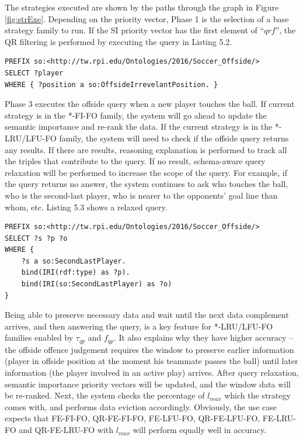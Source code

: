 The strategies executed are shown by the paths through the graph in Figure \ref{fig:strExe}. 
Depending on the priority vector, Phase 1 is the selection of a base strategy family to run. 
If the SI priority vector has the first element of ``$qrf$'', the QR filtering is performed by executing the query in Listing 5.2.

\begin{lstlisting}[language=SPARQL,caption={Query Relevance Filtering Query},basicstyle=\small,frame=single]
PREFIX so:<http://tw.rpi.edu/Ontologies/2016/Soccer_Offside/>
SELECT ?player 
WHERE { ?position a so:OffsideIrrevelantPosition. }
\end{lstlisting}

Phase 3 executes the offside query when a new player touches the ball.
If current strategy is in the *-FI-FO family, the system will go ahead to update the semantic importance and re-rank the data. 
If the current strategy is in the *-LRU/LFU-FO family, the system will need to check if the offside query returns any results.
If there are results, reasoning explanation is performed to track all the triples that contribute to the query.
If no result, schema-aware query relaxation \cite{hurtado2008query} will be performed to increase the scope of the query.
For example, if the query returns no answer, the system continues to ask who touches the ball, who is the second-last player, who is nearer to the opponents' goal line than whom, etc. 
Listing 5.3 shows a relaxed query.

\begin{lstlisting}[language=SPARQL,caption={A Relaxed Query Example},basicstyle=\small,frame=single]
PREFIX so:<http://tw.rpi.edu/Ontologies/2016/Soccer_Offside/>
SELECT ?s ?p ?o
WHERE {
	?s a so:SecondLastPlayer.
	bind(IRI(rdf:type) as ?p).
	bind(IRI(so:SecondLastPlayer) as ?o)
}
\end{lstlisting}

Being able to preserve necessary data and wait until the next data complement arrives, and then answering the query, is a key feature for *-LRU/LFU-FO families enabled by $\tau_{qp}$ and $f_{qp}$.
It also explains why they have higher accuracy -- the offside offence judgement requires the window to preserve earlier information (player in offside position at the moment his teammate passes the ball) until later information (the player involved in an active play) arrives.
After query relaxation, semantic importance priority vectors will be updated, and the window data will be re-ranked. 
Next, the system checks the percentage of $l_{max}$ which the strategy comes with, and performs data eviction accordingly. 
Obviously, the use case expects that FE-FI-FO, QR-FE-FI-FO, FE-LFU-FO, QR-FE-LFU-FO, FE-LRU-FO and QR-FE-LRU-FO with $l_{max}$ will perform equally well in accuracy. 
%
